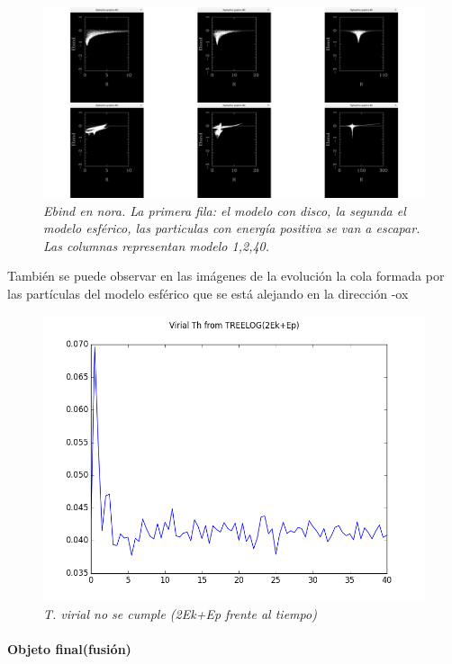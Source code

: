 \documentclass[12pt]{article} %
\renewcommand{\=}[1]{\stackrel{#1}{=}} %
\theoremstyle{definition}
\theoremstyle{remark}
\begin{document}
\begin{figure}[!ht]
 \centering
 \includegraphics[scale=0.2]{ebindsep5.png}
 \caption{\emph{ Ebind en nora. La primera fila: el modelo con disco, la segunda el modelo esférico, las particulas con energía positiva se van a escapar. Las columnas representan modelo 1,2,40.
}}
\end{figure}

También se puede observar en las imágenes de la evolución la cola formada por las partículas del modelo esférico que se está alejando en la dirección -ox


\begin{figure}[!ht]
 \centering
 \includegraphics[scale=0.4]{vt.png}
 \caption{\emph{T. virial no se cumple (2Ek+Ep frente al tiempo)}}
\end{figure}

\clearpage

\paragraph{Objeto final(fusión)}
\end{document}
